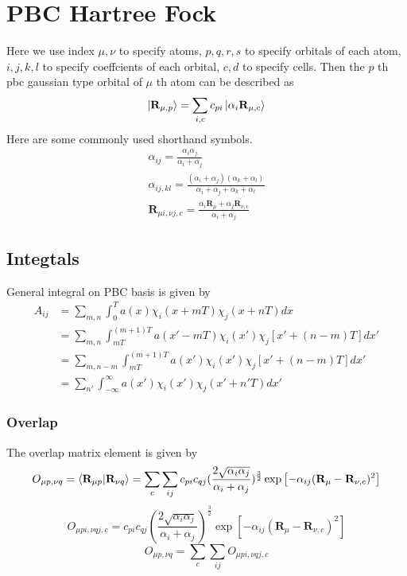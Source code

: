\documentclass{article}
\begin{document}
\section{PBC Hartree Fock}
    Here we use index $\mu,\nu$ to specify atoms,
    $p,q,r,s$ to specify orbitals of each atom,
    $i,j,k,l$ to specify coeffcients of each orbital,
    $c,d$ to specify cells.
    Then the $p$ th pbc gaussian type orbital of $\mu$ th atom can be described as
    \begin{equation}
        \ket{\textbf{R}_{\mu,p}} = \sum_{i,c}c_{pi}\ket{\alpha_{i}\textbf{R}_{\mu,c}}
    \end{equation}
    Here are some commonly used shorthand symbols.
    \begin{gather*}
        \alpha_{ij} = \frac{\alpha_i\alpha_j}{\alpha_i+\alpha_j} \\
        \alpha_{ij,kl} = \frac{(\alpha_i+\alpha_j)(\alpha_k+\alpha_l)}{\alpha_i+\alpha_j+\alpha_k+\alpha_l} \\
        \textbf{R}_{\mu i,\nu j,c} = \frac{\alpha_i\textbf{R}_{\mu}+\alpha_j\textbf{R}_{\nu,c}}{\alpha_i+\alpha_j}
    \end{gather*}

    \subsection{Integtals}
        General integral on PBC basis is given by
        \begin{align*}
            A_{ij} &= \sum_{m,n}\int_0^T a(x)\chi_i(x+mT)\chi_j(x+nT)dx \\
            &= \sum_{m,n}\int_{mT}^{(m+1)T} a(x'-mT)\chi_i(x')\chi_j[x'+(n-m)T]dx' \\
            &= \sum_{m,n-m}\int_{mT}^{(m+1)T} a(x')\chi_i(x')\chi_j[x'+(n-m)T]dx' \\
            &= \sum_{n'}\int_{-\infty}^{\infty} a(x')\chi_i(x')\chi_j(x'+n'T)dx'
        \end{align*}

        \subsubsection{Overlap}
            The overlap matrix element is given by
            \begin{equation}
                O_{\mu p,\nu q} = \braket{\textbf{R}_{\mu p}|\textbf{R}_{\nu q}} 
                = \sum_c\sum_{ij}c_{pi}c_{qj}(\frac{2\sqrt{\alpha_i\alpha_j}}{\alpha_i+\alpha_j})^{\frac{3}{2}}
                \exp\left[-\alpha_{ij}(\textbf{R}_{\mu}-\textbf{R}_{\nu,c})^2\right]
            \end{equation}
            \begin{equation}
                O_{\mu pi,\nu qj,c} = c_{pi}c_{qj}(\frac{2\sqrt{\alpha_i\alpha_j}}{\alpha_i+\alpha_j})^{\frac{3}{2}}
                \exp\left[-\alpha_{ij}(\textbf{R}_{\mu}-\textbf{R}_{\nu,c})^2\right]
            \end{equation}
            \begin{equation}
                O_{\mu p,\nu q} = \sum_c\sum_{ij}O_{\mu pi,\nu qj,c}
            \end{equation}
\end{document}
